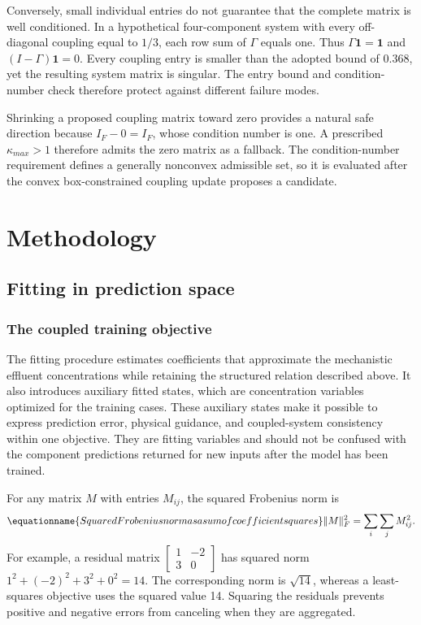 Conversely, small individual entries do not guarantee that the complete matrix is well conditioned. In a hypothetical four-component system with every off-diagonal coupling equal to \(1/3\), each row sum of \(\Gamma\) equals one. Thus \(\Gamma\mathbf{1}=\mathbf{1}\) and \((I-\Gamma)\mathbf{1}=0\). Every coupling entry is smaller than the adopted bound of 0.368, yet the resulting system matrix is singular. The entry bound and condition-number check therefore protect against different failure modes.

Shrinking a proposed coupling matrix toward zero provides a natural safe direction because \(I_F-0=I_F\), whose condition number is one. A prescribed \(\kappa_{max}>1\) therefore admits the zero matrix as a fallback. The condition-number requirement defines a generally nonconvex admissible set, so it is evaluated after the convex box-constrained coupling update proposes a candidate.

\section{Methodology}

\subsection{Fitting in prediction space}

\subsubsection{The coupled training objective}

The fitting procedure estimates coefficients that approximate the mechanistic effluent concentrations while retaining the structured relation described above. It also introduces auxiliary fitted states, which are concentration variables optimized for the training cases. These auxiliary states make it possible to express prediction error, physical guidance, and coupled-system consistency within one objective. They are fitting variables and should not be confused with the component predictions returned for new inputs after the model has been trained.

For any matrix \(M\) with entries \(M_{ij}\), the squared Frobenius norm is
\begin{equation}
\equationname{Squared Frobenius norm as a sum of coefficient squares}
\label{eq:icsor_frobenius_definition}
\|M\|_F^2=\sum_i\sum_j M_{ij}^2.
\end{equation}
For example, a residual matrix \(\begin{bmatrix}1&-2\\3&0\end{bmatrix}\) has squared norm \(1^2+(-2)^2+3^2+0^2=14\). The corresponding norm is \(\sqrt{14}\), whereas a least-squares objective uses the squared value 14. Squaring the residuals prevents positive and negative errors from canceling when they are aggregated.

